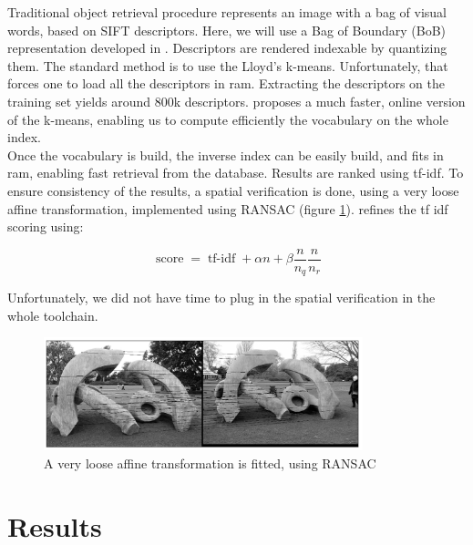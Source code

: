\documentclass{article}
\DeclareMathOperator{\score}{score}
\DeclareMathOperator{\tfidf}{tf-idf}
\begin{document}
Traditional object retrieval procedure represents an image with a bag of
visual words, based on SIFT descriptors. Here, we will use a Bag of Boundary
(BoB) representation developed in \cite{Arandjelovic11}. Descriptors are
rendered indexable by quantizing them. The standard method is to use the
Lloyd's k-means. Unfortunately, that forces one to load all the descriptors in
ram. Extracting the descriptors on the training set yields around 800k
descriptors. \cite{fast-k-means} proposes a much faster, online version of
the k-means, enabling us to compute efficiently the vocabulary on the whole
index. \\
Once the vocabulary is build, the inverse index can be easily build, and fits
in ram, enabling fast retrieval from the database. Results are ranked using
tf-idf. To ensure consistency of the results, a spatial verification is done,
using a very loose affine transformation, implemented using RANSAC (figure
\ref{ransac}). \cite{Arandjelovic11} refines the tf idf scoring using:

\begin{equation*}
\score = \tfidf + \alpha n + \beta \frac{n}{n_q} \frac{n}{n_r}
\end{equation*}

Unfortunately, we did not have time to plug in the spatial verification in the
whole toolchain.

\begin{figure}
\label{ransac}
\begin{center}
\includegraphics[width=350px]{images/matching_01.png}
\end{center}
\caption{A very loose affine transformation is fitted, using RANSAC}
\end{figure}

\section{Results}
\end{document}
